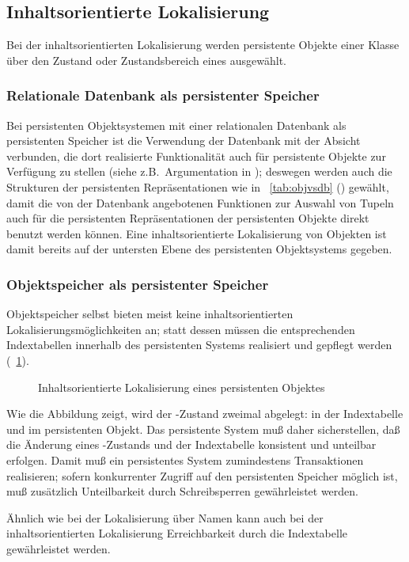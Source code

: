 \subsection{Inhaltsorientierte Lokalisierung}
%
Bei der inhaltsorientierten Lokalisierung werden persistente Objekte
einer Klasse \"{u}ber den Zustand oder Zustandsbereich eines
\Slt[s]\/ ausgew\"{a}hlt.
%
\subsubsection{Relationale Datenbank als persistenter Speicher}
%
Bei persistenten Objektsystemen mit einer relationalen Datenbank als
persistenten Speicher ist die Verwendung der Datenbank mit der Absicht
verbunden, die dort realisierte Funktionalit\"{a}t auch f\"{u}r persistente
Objekte zur Verf\"{u}gung zu stellen (siehe
z.B.\ Argumentation in \cite[]{bib:ro87}); deswegen werden
auch die Strukturen der persistenten Repr\"{a}sentationen wie in
\tablename~\ref{tab:objvsdb} (\citepage{\pageref{tab:objvsdb}})
gew\"{a}hlt, damit die von der Datenbank angebotenen Funktionen zur
Auswahl von Tupeln auch f\"{u}r die persistenten Repr\"{a}sentationen der
persistenten Objekte direkt benutzt werden k\"{o}nnen. Eine
inhaltsorientierte Lokalisierung von Objekten ist damit bereits auf
der untersten Ebene des persistenten Objektsystems gegeben.
%
\subsubsection{Objektspeicher als persistenter Speicher}
%
Objektspeicher selbst bieten meist keine inhaltsorientierten
Lokalisierungsm\"{o}glichkeiten an; statt dessen m\"{u}ssen die
entsprechenden Indextabellen innerhalb des persistenten Systems
realisiert und gepflegt werden (\figurename~\ref{fig:adridx}). %
%
\begin{figure}[htbp]%
\ifbuch%
\centerline{}%
\else%
\centerline{}%
\fi%
\caption{Inhaltsorientierte Lokalisierung eines persistenten
Objektes}%
\label{fig:adridx}%
\end{figure}%
%
Wie die Abbildung zeigt, wird der \Slt\/-Zustand zweimal abgelegt: in
der Indextabelle und im persistenten Objekt. Das persistente System
mu\ss{} daher sicherstellen, da\ss{} die \"{A}nderung eines \Slt\/-Zustands und
der Indextabelle konsistent und unteilbar erfolgen. Damit mu\ss{} ein
persistentes System zumindestens Transaktionen realisieren; sofern
konkurrenter Zugriff auf den persistenten Speicher m\"{o}glich ist, mu\ss{}
zus\"{a}tzlich Unteilbarkeit durch Schreibsperren gew\"{a}hrleistet werden.
%
\par{}\"{A}hnlich wie bei der Lokalisierung \"{u}ber Namen kann auch bei der
inhaltsorientierten Lokalisierung Erreichbarkeit durch die
Indextabelle gew\"{a}hrleistet werden.
%
